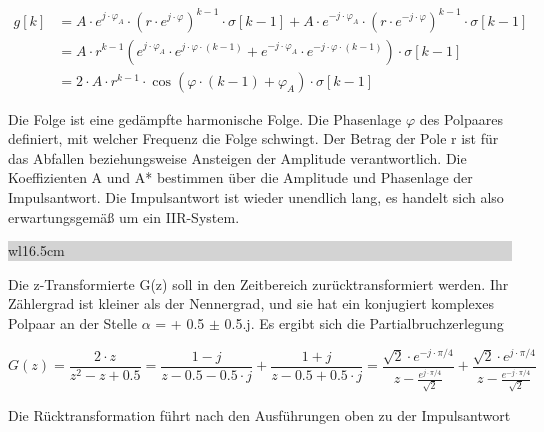 \begin{equation}\label{eq:sixsonehundredfour}
\begin{split}
g\left[k\right] & = A\cdot e^{j\cdot \varphi _{A} } \cdot \left(r\cdot e^{j\cdot \varphi}\right)^{k-1} \cdot \sigma \left[k-1\right]+A\cdot e^{-j\cdot \varphi _{A} } \cdot\left(r\cdot e^{-j\cdot \varphi }\right)^{k-1} \cdot \sigma \left[k-1\right] \\ 
& = A\cdot r^{k-1} \left(e^{j\cdot \varphi _{A} } \cdot e^{j\cdot \varphi \cdot \left(k-1\right)} +e^{-j\cdot \varphi _{A} } \cdot e^{-j\cdot \varphi \cdot \left(k-1\right)} \right)\cdot \sigma \left[k-1\right] \\
&=2\cdot A\cdot r^{k-1} \cdot \cos \left(\varphi \cdot \left(k-1\right)+\varphi _{A} \right)\cdot \sigma \left[k-1\right]
\end{split}
\end{equation}

\noindent Die Folge ist eine ged\"{a}mpfte harmonische Folge. Die Phasenlage $\varphi$ des Polpaares definiert, mit welcher Frequenz die Folge schwingt. Der Betrag der Pole r ist f\"{u}r das Abfallen beziehungsweise Ansteigen der Amplitude verantwortlich. Die Koeffizienten A und A* bestimmen \"{u}ber die Amplitude und Phasenlage der Impulsantwort. Die Impulsantwort ist wieder unendlich lang, es handelt sich also erwartungsgem\"{a}{\ss} um ein IIR-System.\bigskip

\noindent
\colorbox{lightgray}{%
%
\renewcommand\arraystretch{0.6}%
\begin{tabular}{ wl{16.5cm} }
{}
\end{tabular}%
}\medskip

\noindent Die z-Transformierte G(z) soll in den Zeitbereich zur\"{u}cktransformiert werden. Ihr Z\"{a}hlergrad ist kleiner als der Nennergrad, und sie hat ein konjugiert komplexes Polpaar an der Stelle $\alpha$ = + 0.5 $\pm$ 0.5$.$j. Es ergibt sich die Partialbruchzerlegung

\begin{equation}\label{eq:sixsonehundredfive}
G\left(z\right)=\frac{2\cdot z}{z^{2} -z+0.5} =\frac{1-j}{z-0.5-0.5\cdot j}+\frac{1+j}{z-0.5+0.5\cdot j}=\frac{\sqrt{2}\cdot e^{-j\cdot\pi/4}}{z-\frac{e^{j\cdot \pi /4} }{\sqrt{2} } } +\frac{\sqrt{2} \cdot e^{j\cdot\pi /4}}{z-\frac{e^{-j\cdot \pi /4} }{\sqrt{2}}}
\end{equation}

\noindent Die R\"{u}cktransformation f\"{u}hrt nach den Ausf\"{u}hrungen oben zu der Impulsantwort

